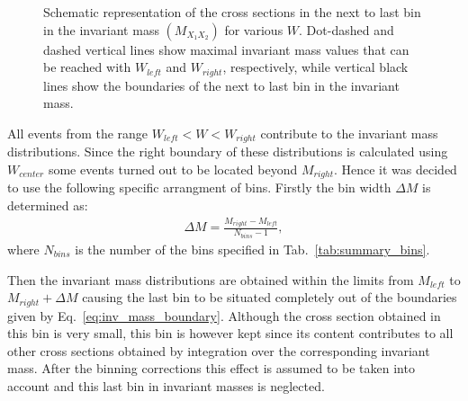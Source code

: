 \documentclass[prc,twocolumn,superscriptaddress,showpacs,amssymb,amsmath,amsfonts,linenumbers,aps]{revtex4-1}
\begin{document}
\begin{figure}[htp]
\begin{center}
\caption{\small Schematic representation of the cross sections in the next to last bin in the invariant mass $(M_{X_{1}X_{2}})$ for various $W$. Dot-dashed and dashed vertical lines show  maximal invariant mass values that can be reached with $W_{left}$ and $W_{right}$, respectively, while vertical black  lines show the boundaries of the next to last bin in the invariant mass.  \label{fig:mass_corr}}
\end{center}
\end{figure}

All events from the range $W_{left} < W < W_{right}$ contribute to the invariant mass distributions. Since
the right boundary of these distributions  is calculated using $W_{center}$ some events turned out to be located beyond $M_{right}$. 
Hence it was decided to use the following specific arrangment of bins.
 Firstly the bin width $\Delta M$ is determined as:
\begin{equation}
\begin{aligned}
\Delta M = \frac{M_{right}-M_{left}}{N_{bins}-1}, \label{eq:bin_width}
\end{aligned}  
\end{equation} 
where $N_{bins}$ is the number of the bins specified in Tab.~\ref{tab:summary_bins}. 

Then the invariant mass distributions are obtained within the limits from $M_{left}$ to $M_{right}+\Delta M$ causing the last bin to be situated completely out of the boundaries given by Eq.~\ref{eq:inv_mass_boundary}. Although the cross section obtained in this bin is very small, this bin is however kept since its content contributes to all other cross sections obtained by integration over the corresponding invariant mass. 
After the binning corrections this effect is assumed to be taken into account and this last bin in invariant masses is neglected. 
\end{document}
